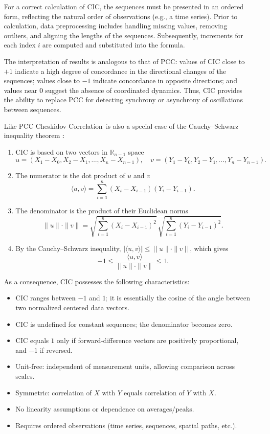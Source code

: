 \documentclass[aoas]{imsart}
\newcommand{\cic}{\text{CIC}}
\newcommand{\cicFull}{\textnormal{Cheskidov Correlation}}
\newcommand{\pcc}{\text{PCC}}
\begin{document}
For a correct calculation of $\cic$, the sequences must be presented in an ordered form, reflecting the natural order of observations (e.g., a time series). Prior to calculation, data preprocessing includes handling missing values, removing outliers, and aligning the lengths of the sequences. Subsequently, increments for each index $i$ are computed and substituted into the formula.

The interpretation of results is analogous to that of PCC: values of $\cic$ close to $+1$ indicate a high degree of concordance in the directional changes of the sequences; values close to $-1$ indicate concordance in opposite directions; and values near $0$ suggest the absence of coordinated dynamics. Thus, $\cic$ provides the ability to replace PCC for detecting synchrony or asynchrony of oscillations between sequences.

Like $\pcc$ \cicFull\ is also a special case of the Cauchy\allowbreak--\allowbreak Schwarz inequality theorem \cite{r3}:
\begin{enumerate}
\item $\cic$ is based on two vectors in $\mathbb{R}_{n-1}$ space
\[
u = (X_1-X_0, X_2-X_1, \dots, X_n-X_{n-1}), \quad
v = (Y_1-Y_0, Y_2-Y_1, \dots, Y_n-Y_{n-1}).
\]
\item The numerator is the dot product of $u$ and $v$
\[
\langle u,v \rangle = \sum_{i=1}^n (X_i - X_{i-1})(Y_i - Y_{i-1}).
\]
\item The denominator is the product of their Euclidean norms
\[
\|u\| \cdot \|v\| = \sqrt{\sum_{i=1}^n (X_i - X_{i-1})^2} \, \sqrt{\sum_{i=1}^n (Y_i - Y_{i-1})^2}.
\]
\item By the Cauchy–Schwarz inequality, $|\langle u,v \rangle| \le \|u\|\cdot \|v\|$, which gives
\[
-1 \le \frac{\langle u,v \rangle}{\|u\|\cdot \|v\|} \le 1.
\]
\end{enumerate}

As a consequence, $\cic$ possesses the following characteristics:
\begin{itemize}
\item $\cic$ ranges between $-1$ and $1$; it is essentially the cosine of the angle between two normalized centered data vectors.
\item $\cic$ is undefined for constant sequences; the denominator becomes zero.
\item $\cic$ equals $1$ only if forward-difference vectors are positively proportional, and $-1$ if reversed.
\item Unit-free: independent of measurement units, allowing comparison across scales.
\item Symmetric: correlation of $X$ with $Y$ equals correlation of $Y$ with $X$.
\item No linearity assumptions or dependence on averages/peaks.
\item Requires ordered observations (time series, sequences, spatial paths, etc.).
\end{itemize}
\end{document}
